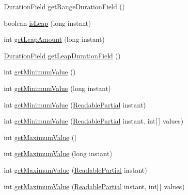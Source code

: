 \begin{DoxyCompactItemize}
\hyperlink{classorg_1_1joda_1_1time_1_1_duration_field}{Duration\-Field} \hyperlink{classorg_1_1joda_1_1time_1_1field_1_1_delegated_date_time_field_a1185b68a51dcb238adbeb1a40d4aef0c}{get\-Range\-Duration\-Field} ()
\item 
boolean \hyperlink{classorg_1_1joda_1_1time_1_1field_1_1_delegated_date_time_field_ac1c26a928458096e8916d4f8b0f26ac6}{is\-Leap} (long instant)
\item 
int \hyperlink{classorg_1_1joda_1_1time_1_1field_1_1_delegated_date_time_field_a066c8f8d90612b83686a5d7e703d0af5}{get\-Leap\-Amount} (long instant)
\item 
\hyperlink{classorg_1_1joda_1_1time_1_1_duration_field}{Duration\-Field} \hyperlink{classorg_1_1joda_1_1time_1_1field_1_1_delegated_date_time_field_ad090ebdbb42f4a931b4dd4c7d85eed25}{get\-Leap\-Duration\-Field} ()
\item 
int \hyperlink{classorg_1_1joda_1_1time_1_1field_1_1_delegated_date_time_field_aeda966db7048e46f1dccb9ae2c9eb7c5}{get\-Minimum\-Value} ()
\item 
int \hyperlink{classorg_1_1joda_1_1time_1_1field_1_1_delegated_date_time_field_a0f06d12dffd0dba679cf756c47ef6789}{get\-Minimum\-Value} (long instant)
\item 
int \hyperlink{classorg_1_1joda_1_1time_1_1field_1_1_delegated_date_time_field_a78821e08f00493eeb560a381b805153c}{get\-Minimum\-Value} (\hyperlink{interfaceorg_1_1joda_1_1time_1_1_readable_partial}{Readable\-Partial} instant)
\item 
int \hyperlink{classorg_1_1joda_1_1time_1_1field_1_1_delegated_date_time_field_a9b9f7606223f9c1dcc2ffef93b1d96cc}{get\-Minimum\-Value} (\hyperlink{interfaceorg_1_1joda_1_1time_1_1_readable_partial}{Readable\-Partial} instant, int\mbox{[}$\,$\mbox{]} values)
\item 
int \hyperlink{classorg_1_1joda_1_1time_1_1field_1_1_delegated_date_time_field_a4f2edfeb2a27c0d9191774adf5cd980b}{get\-Maximum\-Value} ()
\item 
int \hyperlink{classorg_1_1joda_1_1time_1_1field_1_1_delegated_date_time_field_ae2ba21994e4e509dd873c4858f87c902}{get\-Maximum\-Value} (long instant)
\item 
int \hyperlink{classorg_1_1joda_1_1time_1_1field_1_1_delegated_date_time_field_aec3d48f6d6ad3f3dc805250bf771c65c}{get\-Maximum\-Value} (\hyperlink{interfaceorg_1_1joda_1_1time_1_1_readable_partial}{Readable\-Partial} instant)
\item 
int \hyperlink{classorg_1_1joda_1_1time_1_1field_1_1_delegated_date_time_field_a02c938941d0ea08e58616c9f50e54cdc}{get\-Maximum\-Value} (\hyperlink{interfaceorg_1_1joda_1_1time_1_1_readable_partial}{Readable\-Partial} instant, int\mbox{[}$\,$\mbox{]} values)

\end{DoxyCompactItemize}
